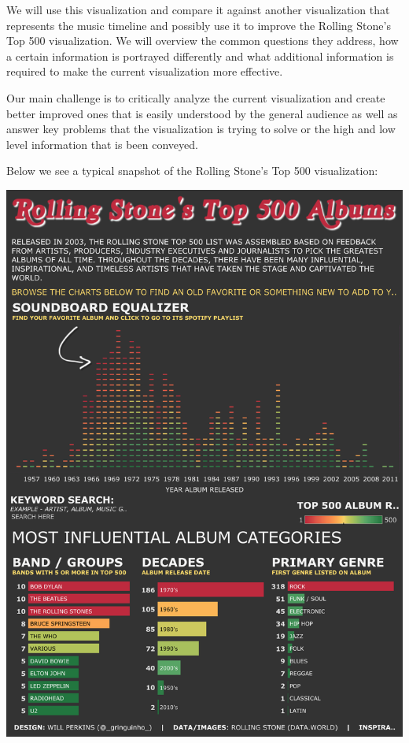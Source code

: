 \documentclass{article}
\begin{document}
We will use this visualization and compare it against another visualization that represents the music timeline \cite{music-timeline} and possibly use it to improve the Rolling Stone's Top 500 visualization. We will overview the common questions they address, how a certain information is portrayed differently and what additional information is required to make the current visualization more effective.

Our main challenge is to critically analyze the current visualization and create better improved ones that is easily understood by the general audience as well as answer key problems that the visualization is trying to solve or the high and low level information that is been conveyed.
    
Below we see a typical snapshot of the Rolling Stone's Top 500 visualization:

\includegraphics[width=\textwidth]{VisualAnalytics/Assignment1/images/rolling-stone-main.png}
\end{document}
